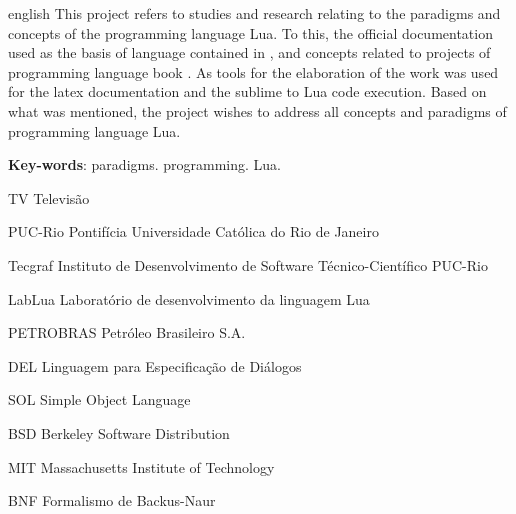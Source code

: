 \documentclass[
12pt, %
openright, %
oneside, %
a4paper, %
english, %
brazil, %
]{abntex2}
\begin{document}
\begin{resumo}[Abstract]
 \begin{otherlanguage*}{english}
   This project refers to studies and research relating to the paradigms and concepts of the programming language Lua. To this, the official documentation used as the basis of language contained in \cite{Lua_Org}, and concepts related to projects of programming language book \cite{Sebesta}. As tools for the elaboration of the work was used for the latex documentation and the sublime to Lua code execution. Based on what was mentioned, the project wishes to address all concepts and paradigms of programming language Lua. 

   \vspace{\onelineskip}
 
   \noindent
   \textbf{Key-words}: paradigms. programming. Lua.
 \end{otherlanguage*}
\end{resumo}

\listoffigures*
\cleardoublepage

\listoftables*
\cleardoublepage

\begin{siglas}
  \item[TV] Televisão 
  \item[PUC-Rio] Pontifícia Universidade Católica do Rio de Janeiro
  \item[Tecgraf] Instituto de Desenvolvimento de Software Técnico-Científico PUC-Rio
  \item[LabLua] Laboratório de desenvolvimento da linguagem Lua
  \item[PETROBRAS]  Petróleo Brasileiro S.A. 
  \item[DEL] Linguagem para Especificação de Diálogos 
  \item[SOL] Simple Object Language
  \item[BSD] Berkeley Software Distribution 
  \item[MIT] Massachusetts Institute of Technology
  \item[BNF] Formalismo de Backus-Naur
\end{siglas}

\end{document}
